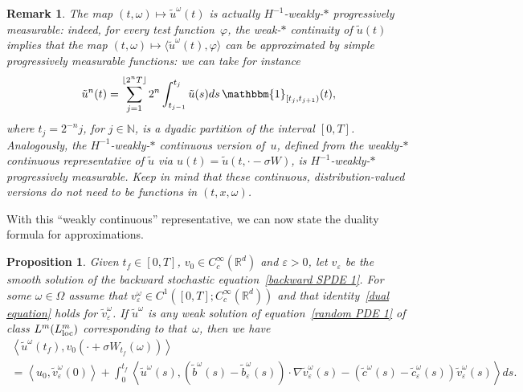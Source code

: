 \documentclass[a4paper,10pt]{article}
\newtheorem{proposition}[theorem]{Proposition}
\newtheorem{remark}[theorem]{Remark}
\newcommand\1{\mathbbm{1}}
\newcommand{\lan}{\langle}
\newcommand{\ran}{\rangle}
\newcommand{\td}{\tilde}
\newcommand{\eps}{\varepsilon}
\newcommand\loc{{\rm loc}}
\numberwithin{equation}{section}
\begin{document}
\begin{remark}\label{weak_cont_progr}
The map $(t,\omega)\mapsto \td{u}^\omega(t)$ is actually $H^{-1}$-weakly-$*$ progressively measurable: indeed, for every test function~$\varphi$, the weak-$*$ continuity of $\td{u}(t)$ implies that the map $(t,\omega)\mapsto \lan\td{u}^\omega(t),\varphi\ran$ can be approximated by simple progressively measurable functions: we can take for instance
\begin{equation*}
\td{u}^n(t) = \sum_{j=1}^{\lfloor 2^n T \rfloor} 2^n \int_{t_{j-1} }^{t_{j}} \td{u}(s) ds \, \1_{[t_j,t_{j+1})}(t),
\end{equation*}
where $t_j = 2^{-n}j$, for $j\in\mathbb{N}$, is a dyadic partition of the interval $[0,T]$. Analogously, the $H^{-1}$-weakly-$*$ continuous version of~$u$, defined from the weakly-$*$ continuous representative of $\td{u}$ via $u(t)=\td{u}(t,\cdot-\sigma W)$, is $H^{-1}$-weakly-$*$ progressively measurable. Keep in mind that these continuous, distribution-valued versions do not need to be functions in $(t,x,\omega)$. 
\end{remark}

With this ``weakly continuous'' representative, we can now state the duality formula for approximations.

\begin{proposition}
Given $t_{f}\in [0,T]$, $v_{0}\in C_{c}^{\infty}(\mathbb{R}^{d})$ and $\varepsilon>0$, let $v_{\eps}$ be the smooth solution of the backward stochastic equation~\eqref{backward SPDE 1}. For some $\omega\in\Omega$ assume that $v_{\eps}^\omega\in C^{1}([0,T];C_{c}^{\infty}(\mathbb{R}^{d}))$ and that identity~\eqref{dual equation} holds for $\widetilde{v}_{\eps}^\omega$. If  $\widetilde{u}^\omega$ is any weak solution of equation~\eqref{random PDE 1} of class $L^{m}(L^{m}_\loc)$ corresponding to that~$\omega$, then we have 
\begin{multline}
\left\langle \widetilde{u}^\omega(t_{f}) ,v_{0}(\cdot+\sigma W_{t_{f}}(\omega))  \right\rangle
\label{duality formula} \\
 = \left\langle u_{0},\widetilde{v}_{\eps}^\omega(0) \right\rangle +\int_{0}^{t_{f}}\left\langle \widetilde{u}^\omega(s),(\widetilde{b}^\omega(s)  -\widetilde{b}_{\eps}^\omega(s))  \cdot\nabla\widetilde{v}_{\eps}^\omega(s)  - (  \widetilde{c}^\omega(s) -\widetilde{c}_{\eps}^\omega(s))  \widetilde{v}_{\eps}^\omega(s)  \right\rangle ds .
\end{multline}
\end{proposition}
\end{document}

